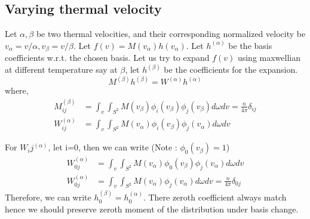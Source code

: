 \documentclass{article}
\begin{document}
\subsection{Varying thermal velocity}
Let $\alpha,\beta$ be two thermal velocities, and their corresponding normalized velocity be $v_\alpha=v/\alpha,v_\beta=v/\beta$.
Let $f(v) = M(v_\alpha) h(v_\alpha)$. Let $h^{(\alpha)}$ be the basis coefficients w.r.t. the chosen basis. Let us try to expand $f(v)$ using maxwellian at different temperature say at $\beta$, let $h^{(\beta)}$ be the coefficients for the expansion.
\begin{equation}
    M^{(\beta)} h^{(\beta)} = W^{(\alpha)} h^{(\alpha)}
\end{equation} where, 
\begin{align}
    M^{(\beta)}_{ij} &= \int_{v} \int_{S^2} M(v_\beta) \phi_i(v_\beta) \phi_j(v_\beta) d\omega dv  = \frac{n}{4\pi} \delta_{ij} \\
    W^{(\alpha)}_{ij} &= \int_{v} \int_{S^2} M(v_\alpha) \phi_i(v_\beta) \phi_j(v_\alpha) d\omega dv   
\end{align}

For $W_ij^{(\alpha)}$, let i=0, then we can write (Note : $\phi_0(v_\beta)=1$)
\begin{align*}
    W^{(\alpha)}_{0j} &= \int_{v} \int_{S^2} M(v_\alpha) \phi_0(v_\beta) \phi_j(v_\alpha) d\omega dv\\
    W^{(\alpha)}_{0j} &= \int_{v} \int_{S^2} M(v_\alpha) \phi_j(v_\alpha) d\omega dv = \frac{n}{4\pi} \delta_{0j}
\end{align*}
Therefore, we can write $h^{(\beta)}_0=h^{(\alpha)}_0$. There zeroth coefficient always match hence we should preserve zeroth moment of the distribution under basis change.  
\end{document}
